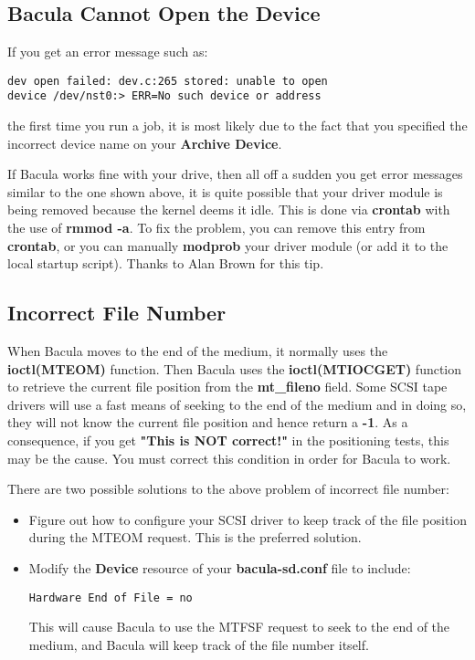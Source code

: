 \label{opendevice}
\subsection{Bacula Cannot Open the Device}

If you get an error message such as:

\footnotesize
\begin{verbatim}
dev open failed: dev.c:265 stored: unable to open
device /dev/nst0:> ERR=No such device or address
\end{verbatim}
\normalsize

the first time you run a job, it is most likely due to the fact that you
specified the incorrect device name on your {\bf Archive Device}.

If Bacula works fine with your drive, then all off a sudden you get error
messages similar to the one shown above, it is quite possible that your driver
module is being removed because the kernel deems it idle. This is done via
{\bf crontab} with the use of {\bf rmmod -a}. To fix the problem, you can
remove this entry from {\bf crontab}, or you can manually {\bf modprob} your
driver module (or add it to the local startup script). Thanks to Alan Brown
for this tip.
\label{IncorrectFiles}

\subsection{Incorrect File Number}

When Bacula moves to the end of the medium, it normally uses the {\bf
ioctl(MTEOM)} function. Then Bacula uses the {\bf ioctl(MTIOCGET)} function to
retrieve the current file position from the {\bf mt\_fileno} field. Some SCSI
tape drivers will use a fast means of seeking to the end of the medium and in
doing so, they will not know the current file position and hence return a {\bf
-1}. As a consequence, if you get {\bf "This is NOT correct!"} in the
positioning tests, this may be the cause. You must correct this condition in
order for Bacula to work.

There are two possible solutions to the above problem of incorrect file
number:

\begin{itemize}
\item Figure out how to configure your SCSI driver to  keep track of the file
   position during the MTEOM  request. This is the preferred solution.
\item Modify the {\bf Device} resource of your {\bf bacula-sd.conf} file  to
   include:

\footnotesize
\begin{verbatim}
Hardware End of File = no
\end{verbatim}
\normalsize

This will cause Bacula to use the MTFSF request to  seek to the end of the
medium, and Bacula will keep  track of the file number itself.
\end{itemize}

